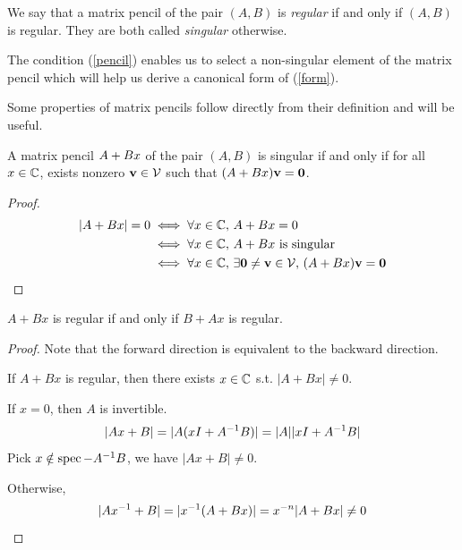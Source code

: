 We say that a matrix pencil of the pair $(A,B)$ is \textit{regular} if and only if $(A,B)$ is regular.  They are both called \textit{singular} otherwise.

The condition (\ref{pencil}) enables us to select a non-singular element of the matrix pencil which will help us derive a canonical form of (\ref{form}).

Some properties of matrix pencils follow directly from their definition and will be useful.
\begin{lemma}
    \label{lemma:singular_from_vector}
    A matrix pencil $A+Bx$ of the pair $(A,B)$ is singular if and only if for all $x\in\mathbb{C}$, exists nonzero $\mathbf{v}\in\mathcal{V}$ such that $(A+Bx)\mathbf{v}=\mathbf{0}$.
\end{lemma}
\begin{proof}
    \begin{align*}
        |A+Bx|=0
        &\iff \forall x\in\mathbb{C},\, A+Bx=0\\
        &\iff \forall x\in\mathbb{C},\, A+Bx \text{ is singular}\\
        &\iff \forall x\in\mathbb{C},\, \exists \mathbf{0}\neq\mathbf{v}\in\mathcal{V},\, (A+Bx)\mathbf{v} = \mathbf{0}\\
    \end{align*}
\end{proof}

\begin{lemma}
    \label{lemma:regular_symm}
    $A+Bx$ is regular if and only if $B+Ax$ is regular.
\end{lemma}
\begin{proof}
    Note that the forward direction is equivalent to the backward direction.

    If $A+Bx$ is regular, then there exists $x\in\mathbb{C}$ s.t. $|A+Bx|\neq0$.

    If $x=0$, then $A$ is invertible.
    \begin{equation*}
        |Ax+B|=|A(xI+A^{-1} B)|=|A||xI+A^{-1} B|
    \end{equation*}
    Pick $x\notin\operatorname{spec} -A^{-1} B$, we have $|Ax+B|\neq0$.

    Otherwise,
    \begin{equation*}
        |Ax^{-1}+B|=|x^{-1}(A+Bx)|=x^{-n}|A+Bx|\neq0
    \end{equation*}
\end{proof}

